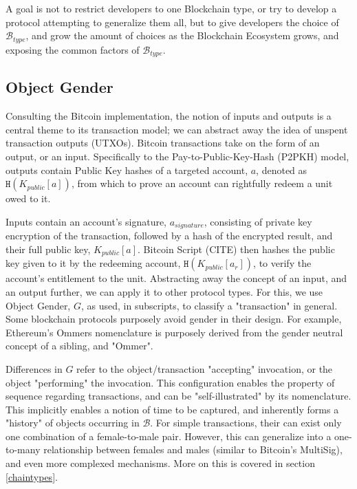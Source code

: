 \documentclass[12pt, titlepage, twocolumn]{report}
\begin{document}
A goal is not to restrict developers to one Blockchain type, or try to develop a protocol attempting to generalize them all, but to give developers the choice of \(\boldsymbol{\mathcal{B}}_{type}\), and grow the amount of choices as the Blockchain Ecosystem grows, and exposing the common factors of \(\boldsymbol{\mathcal{B}}_{type}\).

\subsection{Object Gender}
Consulting the Bitcoin implementation, the notion of inputs and outputs is a central theme to its transaction model; we can abstract away the idea of unspent transaction outputs (UTXOs). Bitcoin transactions take on the form of an output, or an input. Specifically to the Pay-to-Public-Key-Hash (P2PKH) model, outputs contain Public Key hashes of a targeted account, \(a\), denoted as \(\boldsymbol{\texttt{H}}(K_{public}[a])\), from which to prove an account can rightfully redeem a unit owed to it. 

Inputs contain an account's signature, \(a_{signature}\), consisting of private key encryption of the transaction, followed by a hash of the encrypted result, and their full public key, \(K_{public}[a]\). Bitcoin Script (CITE) then hashes the public key given to it by the redeeming account, \(\boldsymbol{\texttt{H}}(K_{public}[a_r])\), to verify the account's entitlement to the unit. Abstracting away the concept of an input, and an output further, we can apply it to other protocol types. For this, we use Object Gender, \(G\), as used, in subscripts, to classify a "transaction" in general. Some blockchain protocols purposely avoid gender in their design. For example, Ethereum's Ommers nomenclature is purposely derived from the gender neutral concept of a sibling, and "Ommer".

Differences in \(G\) refer to the object/transaction "accepting" invocation, or the object "performing" the invocation. This configuration enables the property of sequence regarding transactions, and can be "self-illustrated" by its nomenclature. This implicitly enables a notion of time to be captured, and inherently forms a "history" of objects occurring in \(\boldsymbol{\mathcal{B}}\). For simple transactions, their can exist only one combination of a female-to-male pair. However, this can generalize into a one-to-many relationship between females and males (similar to Bitcoin's MultiSig), and even more complexed mechanisms. More on this is covered in section \ref{chaintypes}. 
\end{document}
